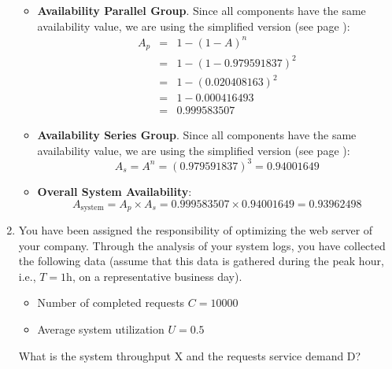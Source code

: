 \begin{enumerate}
\begin{itemize}
        \item \textbf{Availability Parallel Group}. Since all components have the same availability value, we are using the simplified version (see page \pageref{eq: Availability of Parallel System - Simplified}):
        \begin{equation*}
            \begin{array}{rcl}
                A_p &=& 1 - \left(1 - A\right)^{n} \\ [.3em]
                &=& 1 - \left(1 - 0.979591837\right)^{2} \\ [.3em]
                &=& 1 - \left(0.020408163\right)^{2} \\ [.3em]
                &=& 1 - 0.000416493 \\ [.3em]
                &=& 0.999583507
            \end{array}
        \end{equation*}

        \item \textbf{Availability Series Group}. Since all components have the same availability value, we are using the simplified version (see page \pageref{eq: Availability of Series System - Simplified}):
        \begin{equation*}
            A_s = A^{n} = \left(0.979591837\right)^3 = 0.94001649
        \end{equation*}

        \item \textbf{Overall System Availability}:
        \begin{equation*}
            A_{\text{system}} = A_p \times A_s = 0.999583507 \times 0.94001649 = \mathbf{0.93962}498
        \end{equation*}
    \end{itemize}

    \newpage

    \item You have been assigned the responsibility of optimizing the web server of your company. Through the analysis of your system logs, you have collected the following data (assume that this data is gathered during the peak hour, i.e., $T = \text{1h}$, on a representative business day).
    \begin{itemize}
        \item Number of completed requests $C = 10000$
        \item Average system utilization $U = 0.5$
    \end{itemize}
    What is the system throughput X and the requests service demand D?


\end{enumerate}
